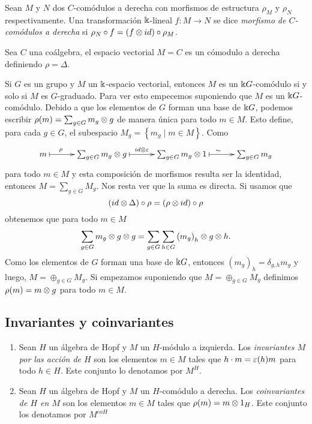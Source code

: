\documentclass[a4paper,oneside,fleqn,11pt,../tesis.tex]{subfiles}
\begin{document}
\begin{definition}
	Sean $M$ y $N$ dos $C$-comódulos a derecha con morfismos de estructura $\rho_M$ y $\rho_N$ respectivamente.
	Una transformación $\Bbbk$-lineal $f: M \to N$ se dice \emph{morfismo de $C$-comódulos a derecha}
	si $\rho_N \circ f = (f \otimes id) \circ \rho_M$.
\end{definition}

\begin{example}
	Sea $C$ una coálgebra, el espacio vectorial $M = C$ es un cómodulo a derecha definiendo $\rho = \Delta$.
\end{example}


\begin{example} \label{exgroupgrading}
	Si $G$ es un grupo y $M$ un $\Bbbk$-espacio vectorial, entonces $M$ es un $\Bbbk G$-comódulo si y solo si $M$ es $G$-graduado.
	Para ver esto empecemos suponiendo que $M$ es un $\Bbbk G$-comódulo. Debido a que los elementos de $G$ forman
	una base de $\Bbbk G$, podemos escribir $\rho(m) = \sum_{g \in G} m_g \otimes g$ de manera única para todo $m \in M$.
	Esto define, para cada $g \in G$, el subespacio $M_g = \left\lbrace m_g \mid m \in M\right\rbrace$. Como
	\begin{align*}
		\xymatrix@=3em{
			m \ar@{|->}[r]^(.3){\rho} & \sum_{g \in G} m_g \ox g \ar@{|->}[r]^{id \ox \veps}
				& \sum_{g \in G} m_g \ox 1 \ar@{|->}[r]^(.5){\sim} & \sum_{g \in G} m_g
		}
	\end{align*}		 
	para todo $m \in M$ y esta composición de morfismos resulta ser la identidad, entonces $M = \sum_{g \in G} M_g$.
	Nos resta ver que la suma es directa. Si usamos que
	\[
	(id \otimes \Delta) \circ \rho = (\rho \otimes id) \circ \rho
	\]
	obtenemos que para todo $m \in M$
	\[
	\sum_{g \in G} m_g \otimes g \otimes g  = \sum_{g \in G}	\sum_{h \in G} \left({m_g}\right)_{h} \otimes g \otimes h. 
	\]
	Como los elementos de $G$ forman una base de $\Bbbk G$, entonces $({m_g})_h = \delta_{g, h} m_{g}$ y luego, $M = \oplus_{g \in G} M_g$.
	Si empezamos suponiendo que $M = \oplus_{g \in G} M_g$ definimos $\rho(m) = m \otimes g$ para todo $m \in M$.
\end{example}

\subsection{Invariantes y coinvariantes}

\begin{definition}
	\begin{enumerate}[(1)]
		\item
		Sean $H$ un álgebra de Hopf y $M$ un $H$-módulo a izquierda. Los \emph{invariantes $M$ por las acción de $H$} son los elementos $m \in M$
		tales que $h \cdot m = \varepsilon(h)m$ para todo $h \in H$. Este conjunto lo denotamos por $M^{H}$.
		\item
		Sean $H$ un álgebra de Hopf y $M$ un $H$-comódulo a derecha. Los \emph{coinvariantes de $H$ en $M$} son los elementos $m \in M$
		tales que $\rho(m) = m \otimes 1_{H}$. Este conjunto los denotamos por $M^{coH}$
	\end{enumerate}
\end{definition}
\end{document}
